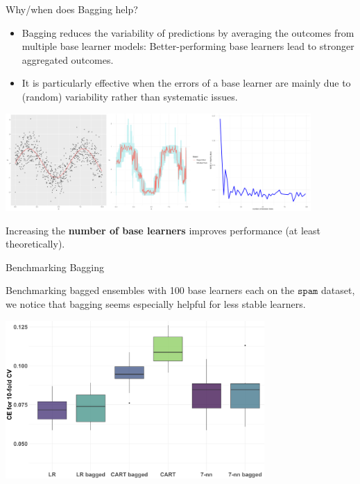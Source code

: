 \documentclass[11pt,compress,t,notes=noshow, xcolor=table]{beamer}
\begin{document}
\begin{vbframe}{Why/when does Bagging help?}

\begin{itemize}
  \item Bagging reduces the variability of predictions by averaging the outcomes from multiple base learner models: Better-performing base learners lead to stronger aggregated outcomes.

  \item It is particularly effective when the errors of a base learner are mainly due to (random) variability rather than systematic issues.
\end{itemize}

\begin{center}
\includegraphics[width=330pt]{figure/bagging-mean.png}
\end{center}

\begin{center}
\footnotesize{Increasing the \textbf{number of base learners} improves performance (at least theoretically).}
\end{center}

\end{vbframe}

\begin{vbframe}{Benchmarking Bagging}

Benchmarking bagged ensembles with 100 base learners each on the $\texttt{spam}$ dataset, we notice that bagging seems especially helpful for less stable learners.

\begin{center}
\includegraphics[width=280pt]{figure/bagging-bench.png}
\end{center}

\end{vbframe}


\endlecture
\end{document}
